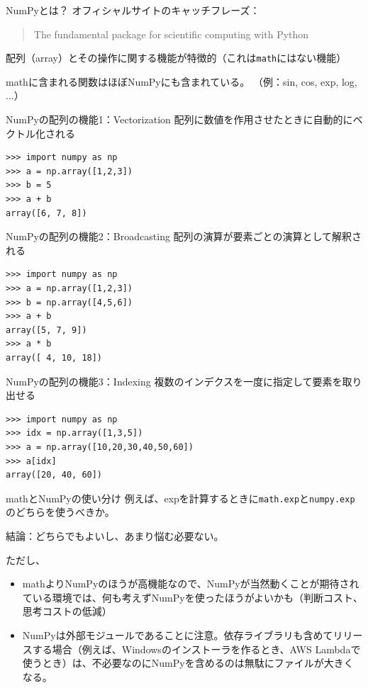 \documentclass[unicode,lualatex,aspectratio=169]{beamer}
\begin{document}
\begin{frame}[fragile]{NumPyとは？}
  オフィシャルサイトのキャッチフレーズ：
  \begin{quote}
    The fundamental package for scientific computing with Python
  \end{quote}

  配列（array）とその操作に関する機能が特徴的（これは\verb|math|にはない機能）


  mathに含まれる関数はほぼNumPyにも含まれている。
  （例：sin, cos, exp, log, ...）
\end{frame}
\begin{frame}[fragile]{NumPyの配列の機能1：Vectorization}
配列に数値を作用させたときに自動的にベクトル化される  
\fontsize{10pt}{10pt}\selectfont    
\begin{verbatim}
>>> import numpy as np
>>> a = np.array([1,2,3])
>>> b = 5
>>> a + b
array([6, 7, 8])
\end{verbatim}
\end{frame}
\begin{frame}[fragile]{NumPyの配列の機能2：Broadcasting}
配列の演算が要素ごとの演算として解釈される
\fontsize{10pt}{10pt}\selectfont    
\begin{verbatim}
>>> import numpy as np
>>> a = np.array([1,2,3])
>>> b = np.array([4,5,6])
>>> a + b
array([5, 7, 9])
>>> a * b
array([ 4, 10, 18])
\end{verbatim}
\end{frame}
\begin{frame}[fragile]{NumPyの配列の機能3：Indexing}
  複数のインデクスを一度に指定して要素を取り出せる
\fontsize{10pt}{10pt}\selectfont    
\begin{verbatim}
>>> import numpy as np
>>> idx = np.array([1,3,5])
>>> a = np.array([10,20,30,40,50,60])
>>> a[idx]
array([20, 40, 60])
\end{verbatim}  
\end{frame}
\begin{frame}[fragile]{mathとNumPyの使い分け}
  例えば、expを計算するときに{\tt math.exp}と{\tt numpy.exp}のどちらを使うべきか。\vspace{1cm}


結論：どちらでもよいし、あまり悩む必要ない。

ただし、
  \begin{itemize}
  \item mathよりNumPyのほうが高機能なので、NumPyが当然動くことが期待されている環境では、何も考えずNumPyを使ったほうがよいかも（判断コスト、思考コストの低減）
  \item NumPyは外部モジュールであることに注意。依存ライブラリも含めてリリースする場合（例えば、Windowsのインストーラを作るとき、AWS Lambdaで使うとき）は、不必要なのにNumPyを含めるのは無駄にファイルが大きくなる。
  \end{itemize}
\end{frame}
\end{document}
